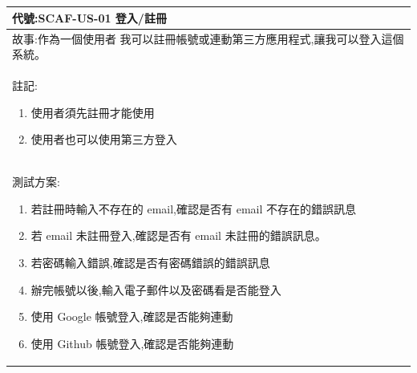 \documentclass{report}
\begin{document}
\subsection*{}
\fontsize{12}{20}\selectfont
\begin{tabularx}{\textwidth}{|X|}
  \hline
  代號:SCAF-US-01 登入/註冊 \\ \hline
  故事:作為一個使用者
  我可以註冊帳號或連動第三方應用程式,讓我可以登入這個系統。 \\ \hline
  註記:
  \begin{enumerate}
    \item 使用者須先註冊才能使用
    \item 使用者也可以使用第三方登入 
  \end{enumerate} \\ \hline
  測試方案:
  \begin{enumerate}
    \item 若註冊時輸入不存在的 email,確認是否有 email 不存在的錯誤訊息
    \item 若 email 未註冊登入,確認是否有 email 未註冊的錯誤訊息。
    \item 若密碼輸入錯誤,確認是否有密碼錯誤的錯誤訊息
    \item 辦完帳號以後,輸入電子郵件以及密碼看是否能登入
    \item 使用 Google 帳號登入,確認是否能夠連動
    \item 使用 Github 帳號登入,確認是否能夠連動
  \end{enumerate} \\ \hline
\end{tabularx}
\end{document}
